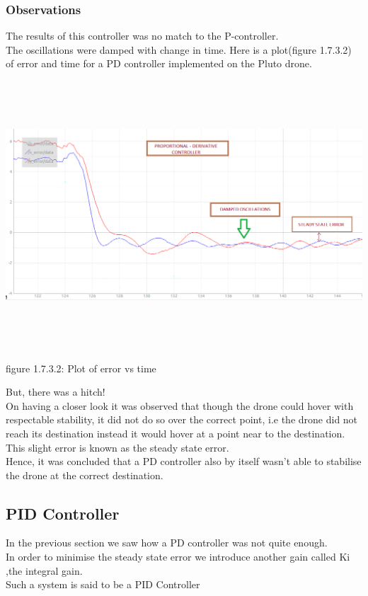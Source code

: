 \documentclass[a4paper,12pt,oneside]{book}
\begin{document}
\subsubsection{\textbf{Observations}}
The results of this controller was no match to the P-controller.\\
The oscillations were damped with change in time.
Here is a plot(figure 1.7.3.2) of error and time for a PD controller implemented on the Pluto drone.
\begin{flushleft}
\includegraphics[width = 15cm , height= 10cm]{pd-controller.png}
\end{flushleft}
\begin{center}
    figure 1.7.3.2: Plot of error vs time
\end{center}
But, there was a hitch! \\
On having a closer look it was observed that though the drone could hover with respectable stability, it did not do so over the correct point, i.e the drone did not reach its destination instead it would hover at a point near to the destination.\\
This slight error is known as the steady state error.\\
Hence, it was concluded that a PD controller also by itself wasn't able to stabilise the drone at the correct destination.

\subsection{PID Controller}
In the previous section we saw how a PD controller was not quite enough.\\
In order to minimise the steady state error we introduce another gain called Ki ,the integral gain.\\
Such a system is said to be a PID Controller
\end{document}
